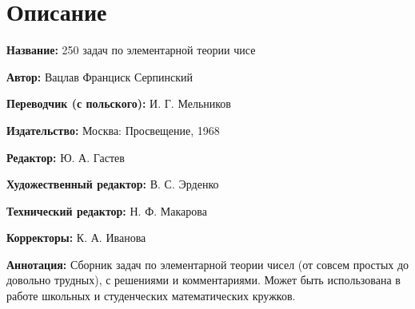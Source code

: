 \documentclass[12pt, a4paper, openany]{book}
\begin{document}
	\newpage
	\tableofcontents
	
	\thispagestyle{empty} %
	
	\newpage
	
	\setcounter{secnumdepth}{0}  
	
	
		\section*{Описание}
	
	{\bf Название:} 250 задач по элементарной теории чисе
	
{\bf Автор:} Вацлав Франциск Серпинский

{\bf Переводчик (с польского):} И. Г. Мельников
	
{\bf Издательство:} Москва: Просвещение, 1968
	
		{\bf Редактор:} Ю. А. Гастев
	
		{\bf Художественный редактор:} В. С. Эрденко
	
		{\bf Технический редактор:} Н. Ф. Макарова
	
		{\bf Корректоры:} К. А. Иванова
	
		{\bf Аннотация:} Сборник задач по элементарной теории чисел (от совсем простых до довольно трудных), с решениями и комментариями. Может быть использована в работе школьных и студенческих математических кружков.
		\thispagestyle{empty} %

	
\end{document}
